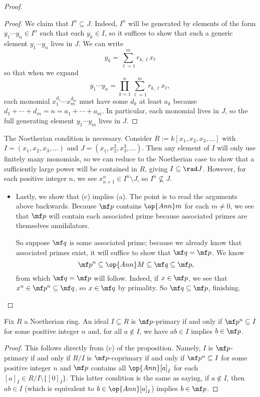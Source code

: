 \documentclass[../notes.tex]{subfiles}
\begin{document}
\begin{proof}
\begin{proof}
		We claim that $I^n\subseteq J$. Indeed, $I^n$ will be generated by elements of the form $y_1\cdots y_n\in I^n$ such that each $y_k\in I$, so it suffices to show that such a generic element $y_1\cdots y_n$ lives in $J$. We can write
		\[y_k=\sum_{\ell=1}^mr_{k,\ell}x_\ell\]
		so that when we expand
		\[y_1\cdots y_n=\prod_{k=1}^n\sum_{\ell=1}^mr_{k,\ell}x_\ell,\]
		each monomial $x_1^{d_1}\cdots x_m^{d_m}$ must have some $d_k$ at least $a_k$ because $d_1+\cdots+d_m=n=a_1+\cdots+a_m$. In particular, each monomial lives in $J$, so the full generating element $y_1\cdots y_m$ lives in $J$.
	\end{proof}
	\begin{remark}[Nir]
		The Noetherian condition is necessary. Consider $R:=k[x_1,x_2,x_3,\ldots]$ with $I=(x_1,x_2,x_3,\ldots)$ and $J=\left(x_1,x_2^2,x_3^3,\ldots\right)$. Then any element of $I$ will only use finitely many monomials, so we can reduce to the Noetherian case to show that a sufficiently large power will be contained in $R$, giving $I\subseteq\rad J$. However, for each positive integer $n$, we see $x_{n+1}^n\in I^n\setminus J$, so $I^n\not\subseteq J$.
	\end{remark}
	\begin{itemize}
		\item Lastly, we show that (c) implies (a). The point is to read the arguments above backwards. Because $\mf p$ contains $\op{Ann}m$ for each $m\ne0$, we see that $\mf p$ will contain each associated prime because associated primes are themselves annihilators.

		So suppose $\mf q$ is some associated prime; because we already know that associated primes exist, it will suffice to show that $\mf q=\mf p$. We know
		\[\mf p^n\subseteq\op{Ann}M\subseteq\mf q\subseteq\mf p,\]
		from which $\mf q=\mf p$ will follow. Indeed, if $x\in\mf p$, we see that $x^n\in\mf p^n\subseteq\mf q$, so $x\in\mf q$ by primality. So $\mf q\subseteq\mf p$, finishing.
		\qedhere
	\end{itemize}
\end{proof}
\begin{corollary}
	Fix $R$ a Noetherian ring. An ideal $I\subseteq R$ is $\mf p$-primary if and only if $\mf p^n\subseteq I$ for some positive integer $n$ and, for all $a\notin I$, we have $ab\in I$ implies $b\in\mf p$.
\end{corollary}
\begin{proof}
	This follows directly from (c) of the proposition. Namely, $I$ is $\mf p$-primary if and only if $R/I$ is $\mf p$-coprimary if and only if $\mf p^n\subseteq I$ for some positive integer $n$ and $\mf p$ contains all $\op{Ann}[a]_I$ for each $[a]_I\in R/I\setminus\{[0]_I\}$. This latter condition is the same as saying, if $a\notin I$, then $ab\in I$ (which is equivalent to $b\in\op{Ann}[a]_I$) implies $b\in\mf p$.
\end{proof}
\end{document}
